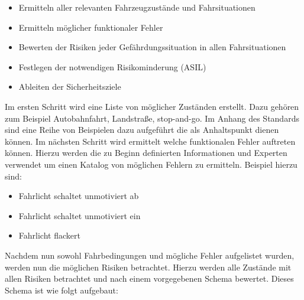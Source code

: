 \documentclass[a4paper,DIV=calc,ngerman]{scrartcl}
\begin{document}
\begin{itemize}
    \item Ermitteln aller relevanten Fahrzeugzustände und Fahrsituationen
    \item Ermitteln möglicher funktionaler Fehler
    \item Bewerten der Risiken jeder Gefährdungssituation in allen Fahrsituationen
    \item Festlegen der notwendigen Risikominderung (ASIL)
    \item Ableiten der Sicherheitsziele
\end{itemize}

Im ersten Schritt wird eine Liste von möglicher Zuständen erstellt. Dazu gehören zum Beispiel Autobahnfahrt, Landstraße, stop-and-go. Im Anhang des Standards sind eine Reihe von Beispielen dazu aufgeführt die als Anhaltspunkt dienen können. Im nächsten Schritt wird ermittelt welche funktionalen Fehler auftreten können. Hierzu werden die zu Beginn definierten Informationen und Experten verwendet um einen Katalog von möglichen Fehlern zu ermitteln. Beispiel hierzu sind:

\begin{itemize}
    \item Fahrlicht schaltet unmotiviert ab
    \item Fahrlicht schaltet unmotiviert ein
    \item Fahrlicht flackert
\end{itemize}

Nachdem nun sowohl Fahrbedingungen und mögliche Fehler aufgelistet wurden, werden nun die möglichen Risiken betrachtet. Hierzu werden alle Zustände mit allen Risiken betrachtet und nach einem vorgegebenen Schema bewertet. Dieses Schema ist wie folgt aufgebaut:
\end{document}
